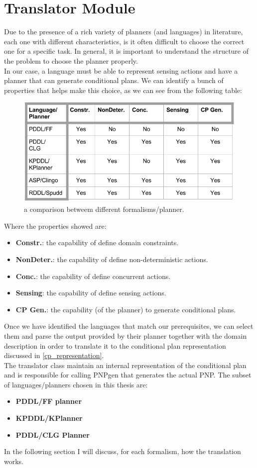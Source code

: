\documentclass[pdftex,12pt,a4paper]{report}
\begin{document}
\section{Translator Module}
Due to the presence of a rich variety of planners (and languages) in literature, each one with different characteristics, is it often difficult to choose the correct one for a specific task.
In general, it is important to understand the structure of the problem to choose the planner properly.\\
In our case, a language must be able to represent sensing actions and have a planner that can generate conditional plans.
We can identify a bunch of properties that helps make this choice, as we can see from the following table:
\begin{figure}[H]
	\centering
	\includegraphics[scale=0.5,trim=30mm 0mm 0mm 0mm]{images/formalisms.png}
	\caption{a comparison betweem different formalisms/planner.}
	\label{fig:formalisms}
\end{figure}
\newpage
Where the properties showed are:
\begin{itemize}
\item \textbf{Constr.}: the capability of define domain constraints.
\item \textbf{NonDeter.}: the capability of define non-deterministic actions.
\item \textbf{Conc.}: the capability of define concurrent actions.
\item \textbf{Sensing}: the capability of define sensing actions.
\item \textbf{CP Gen.}: the capability (of the planner) to generate conditional plans.
\end{itemize}
Once we have identified the languages that match our prerequisites, we can select them and parse the output provided by their planner together with the domain description in order to translate it to the conditional plan representation discussed in \ref{cp_representation}.\\
\newline
The translator class maintain an internal representation of the conditional plan and is responsible for calling PNPgen that generates the actual PNP.
The subset of languages/planners chosen in this thesis are:
\begin{itemize}
\item \textbf{PDDL/FF planner}
\item \textbf{KPDDL/KPlanner}
\item \textbf{PDDL/CLG Planner}
\end{itemize}
In the following section I will discuss, for each formalism, how the translation works.  
\end{document}
